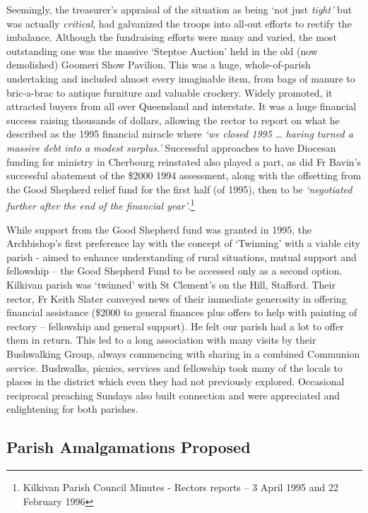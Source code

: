 Seemingly, the treasurer's appraisal of the situation as being `not just \emph{tight'} but was actually \emph{critical}, had galvanized the troops into all-out efforts to rectify the imbalance. Although the fundraising efforts were many and varied, the most outstanding one was the massive `Steptoe Auction' held in the old (now demolished) Goomeri Show Pavilion. This was a huge, whole-of-parish undertaking and included almost every imaginable item, from bags of manure to bric-a-brac to antique furniture and valuable crockery. Widely promoted, it attracted buyers from all over Queensland and interstate. It was a huge financial success raising thousands of dollars, allowing the rector to report on what he described as the 1995 financial miracle where \emph{`we closed 1995 \ldots{} having turned a massive debt into a modest surplus.'} Successful approaches to have Diocesan funding for ministry in Cherbourg reinstated also played a part, as did Fr Bavin's successful abatement of the \$2000 1994 assessment, along with the offsetting from the Good Shepherd relief fund for the first half (of 1995), then to be \emph{`negotiated further after the end of the financial year'}.\footnote{Kilkivan Parish Council Minutes - Rectors reports -- 3 April 1995 and 22 February 1996}


While support from the Good Shepherd fund was granted in 1995, the Archbishop's first preference lay with the concept of `Twinning' with a viable city parish - aimed to enhance understanding of rural situations, mutual support and fellowship -- the Good Shepherd Fund to be accessed only as a second option. Kilkivan parish was `twinned' with St Clement's on the Hill, Stafford. Their rector, Fr Keith Slater conveyed news of their immediate generosity in offering financial assistance (\$2000 to general finances plus offers to help with painting of rectory -- fellowship and general support). He felt our parish had a lot to offer them in return. This led to a long association with many visits by their Bushwalking Group, always commencing with sharing in a combined Communion service. Bushwalks, picnics, services and fellowship took many of the locals to places in the district which even they had not previously explored. Occasional reciprocal preaching Sundays also built connection and were appreciated and enlightening for both parishes.



\subsection{Parish Amalgamations Proposed}



